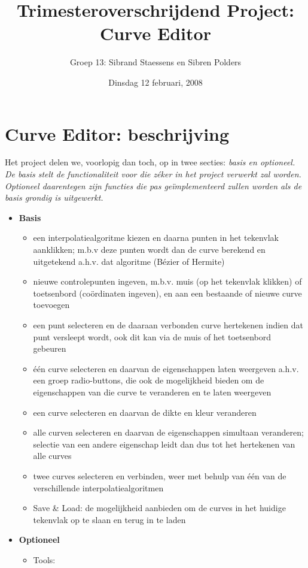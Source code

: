 \documentclass[a4paper,11pt,oneside, titlepage]{article}
\author{Groep 13: Sibrand Staessens en Sibren Polders}
\title{Trimesteroverschrijdend Project: Curve Editor}
\date{Dinsdag 12 februari, 2008}
\begin{document}
\maketitle \newpage
\section{Curve Editor: beschrijving}
Het project delen we, voorlopig dan toch, op in twee secties: \it{basis} \rm{en} \it{optioneel}. \rm{De} \it{basis} \rm{stelt de functionaliteit voor die z\'eker in het project verwerkt zal worden.}\it{ Optioneel}\rm{ daarentegen zijn functies die pas ge\"implementeerd zullen worden als de basis grondig is uitgewerkt.}
\begin{itemize}
\item \bf{Basis}
\begin{itemize}
\item \rm{een interpolatiealgoritme kiezen en daarna punten in het tekenvlak aanklikken; m.b.v deze punten wordt dan de curve berekend en uitgetekend a.h.v. dat algoritme (B\'ezier of Hermite)}
\item \rm{nieuwe controlepunten ingeven, m.b.v. muis (op het tekenvlak klikken) of toetsenbord (co\"ordinaten ingeven), en aan een bestaande of nieuwe curve toevoegen}
\item een punt selecteren en de daaraan verbonden curve hertekenen indien dat punt versleept wordt, ook dit kan via de muis of het toetsenbord gebeuren
\item \'e\'en curve selecteren en daarvan de eigenschappen laten weergeven a.h.v. een groep radio-buttons, die ook de mogelijkheid bieden om de eigenschappen van die curve te veranderen en te laten weergeven
\item een curve selecteren en daarvan de dikte en kleur veranderen
\item alle curven selecteren en daarvan de eigenschappen simultaan veranderen; selectie van een andere eigenschap leidt dan dus tot het hertekenen van alle curves
\item twee curves selecteren en verbinden, weer met behulp van \'e\'en van de verschillende interpolatiealgoritmen
\item Save \& Load: de mogelijkheid aanbieden om de curves in het huidige tekenvlak op te slaan en terug in te laden
\end{itemize}
\item \bf{Optioneel}
\begin{itemize}
\item \rm{Tools:}

\end{itemize}
\end{itemize}
\end{document}
